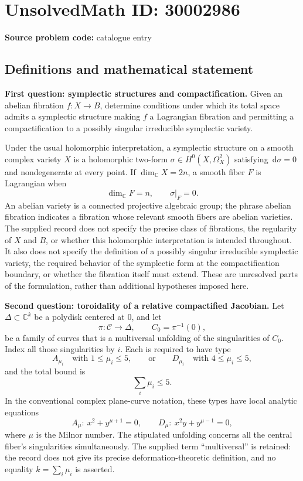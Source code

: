 \documentclass[11pt]{article}
\newcommand{\C}{\mathbb{C}}
\newcommand{\dd}{\,\mathrm{d}}
\begin{document}
\section*{UnsolvedMath ID: 30002986}
\textbf{Source problem code:} catalogue entry
\subsection{Definitions and mathematical statement}
\textbf{First question: symplectic structures and compactification.}
Given an abelian fibration \(f\colon X\to B\), determine conditions under which its total space admits a symplectic structure making \(f\) a Lagrangian fibration and permitting a compactification to a possibly singular irreducible symplectic variety.

Under the usual holomorphic interpretation, a symplectic structure on a smooth complex variety \(X\) is a holomorphic two-form \(\sigma\in H^0(X,\Omega_X^2)\) satisfying \(\dd\sigma=0\) and nondegenerate at every point. If \(\dim_{\C}X=2n\), a smooth fiber \(F\) is Lagrangian when
\[
\dim_{\C}F=n,\qquad \sigma|_F=0.
\]
An abelian variety is a connected projective algebraic group; the phrase abelian fibration indicates a fibration whose relevant smooth fibers are abelian varieties. The supplied record does not specify the precise class of fibrations, the regularity of \(X\) and \(B\), or whether this holomorphic interpretation is intended throughout. It also does not specify the definition of a possibly singular irreducible symplectic variety, the required behavior of the symplectic form at the compactification boundary, or whether the fibration itself must extend. These are unresolved parts of the formulation, rather than additional hypotheses imposed here.

\textbf{Second question: toroidality of a relative compactified Jacobian.}
Let \(\Delta\subset\C^k\) be a polydisk centered at \(0\), and let
\[
\pi\colon\mathcal C\longrightarrow\Delta,\qquad C_0=\pi^{-1}(0),
\]
be a family of curves that is a multiversal unfolding of the singularities of \(C_0\). Index all those singularities by \(i\). Each is required to have type
\[
A_{\mu_i}\quad\text{with }1\leq\mu_i\leq5,
\qquad\text{or}\qquad
D_{\mu_i}\quad\text{with }4\leq\mu_i\leq5,
\]
and the total bound is
\[
\sum_i\mu_i\leq5.
\]
In the conventional complex plane-curve notation, these types have local analytic equations
\[
A_\mu:\ x^2+y^{\mu+1}=0,
\qquad
D_\mu:\ x^2y+y^{\mu-1}=0,
\]
where \(\mu\) is the Milnor number. The stipulated unfolding concerns all the central fiber's singularities simultaneously. The supplied term ``multiversal'' is retained: the record does not give its precise deformation-theoretic definition, and no equality \(k=\sum_i\mu_i\) is asserted.
\end{document}
